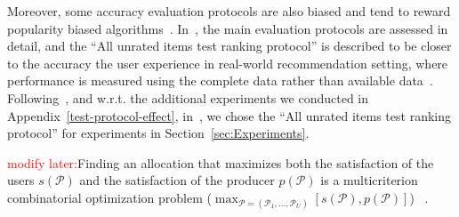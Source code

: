  Moreover, some accuracy evaluation protocols are also  biased and tend to reward  popularity biased algorithms~\cite{cremonesi2010performance,vargas2014improving,steck2013evaluation}.  In~\cite{steck2013evaluation}, the main evaluation protocols are assessed in  detail, and the ``All unrated items test ranking protocol'' is described to be closer to the accuracy the user experience in real-world recommendation setting, where performance is measured using the complete data rather than available data~\cite{steck2013evaluation}. Following~\cite{steck2013evaluation,vargas2014improving}, and w.r.t. the additional experiments we conducted 
\iffullpaper
in Appendix~\ref{test-protocol-effect},
\else 
in~\cite{ourFullVersion},
\fi
 we chose the ``All unrated  items test ranking protocol'' for experiments in  Section~\ref{sec:Experiments}.






 \iffalse  

\textcolor{red}{modify later:}Finding an allocation that maximizes both the satisfaction of the users $s(\mathcal{P})$ and the satisfaction of the producer $p(\mathcal{P})$  is a multicriterion  combinatorial optimization problem  ($ \max _{ \mathcal{P} = (\mathcal{P}_1 , ..., \mathcal{P}_U)}    \left [ s(\mathcal{P}),  p(\mathcal{P}) \right]$) %
~\cite{hwang2012multiple, miettinen2012nonlinear,ehrgott2000survey}. 

